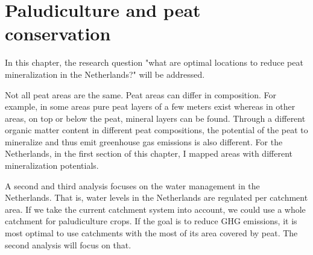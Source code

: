 \documentclass[a4paper,12pt]{scrbook}
\begin{document}

\chapter{Paludiculture and peat conservation}

In this chapter, the research question "what are optimal locations to reduce peat mineralization in the Netherlands?" will be addressed.

Not all peat areas are the same. Peat areas can differ in composition. For example, in some areas pure peat layers of a few meters exist whereas in other areas, on top or below the peat, mineral layers can be found. Through a different organic matter content in different peat compositions, the potential of the peat to mineralize and thus emit greenhouse gas emissions is also different. For the Netherlands, in the first section of this chapter, I mapped areas with different mineralization potentials.

A second and third analysis focuses on the water management in the Netherlands. That is, water levels in the Netherlands are regulated per catchment area. If we take the current catchment system into account, we could use a whole catchment for paludiculture crops. If the goal is to reduce GHG emissions, it is most optimal to use catchments with the most of its area covered by peat. The second analysis will focus on that.
\end{document}
